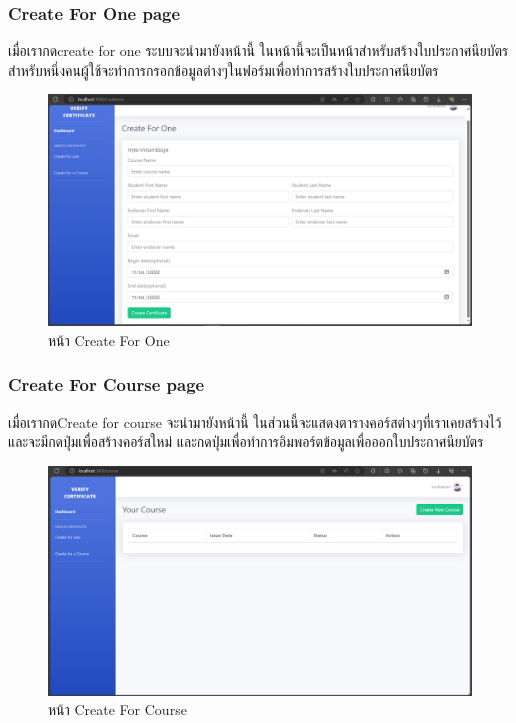 \subsubsection{Create For One page} 
\enskip \enskip \enskip \enskip \enskip
เมื่อเรากดcreate for one ระบบจะนำมายังหน้านี้ ในหน้านี้จะเป็นหน้าสำหรับสร้างใบประกาศนียบัตรสำหรับหนึ่งคนผู้ใช้จะทำการกรอกข้อมูลต่างๆในฟอร์มเพื่อทำการสร้างใบประกาศนียบัตร
\graphicspath{ {./images/} }
\begin{figure}[htbp]
  \centering 
  \includegraphics[scale=0.3]{creone.png}
  \caption[หน้า Create For One]{หน้า Create For One}
  \label{fig:Create For One}
\end{figure}

\subsubsection{Create For Course page} 
\enskip \enskip \enskip \enskip \enskip
เมื่อเรากดCreate for course จะนำมายังหน้านี้ ในส่วนนี้จะแสดงตารางคอร์สต่างๆที่เราเคยสร้างไว้และจะมีกดปุ่มเพื่อสร้างคอร์สใหม่ และกดปุ่มเพื่อทำการอิมพอร์ตข้อมูลเพื่อออกใบประกาศนียบัตร
\graphicspath{ {./images/} }
\begin{figure}[htbp]
  \centering 
  \includegraphics[scale=0.3]{crec.png}
  \caption[หน้า Create For Course]{หน้า Create For Course}
  \label{fig:Create For Course}
\end{figure}
\\\\\\\\
